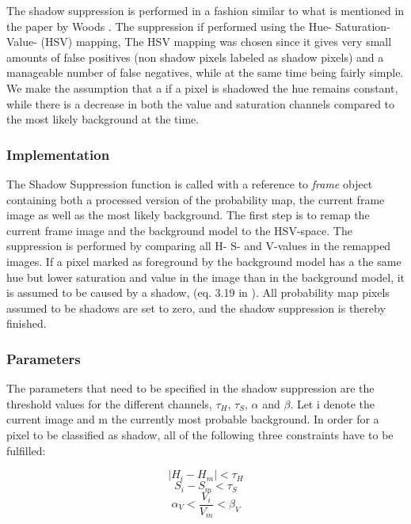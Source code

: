 The shadow suppression is performed in a fashion similar to what is mentioned in the paper by Woods \cite{Wood}. The suppression if performed using the Hue- Saturation- Value- (HSV) mapping, The HSV mapping was chosen since it gives very small amounts of false positives (non shadow pixels labeled as shadow pixels) and a manageable number of false negatives, while at the same time being fairly simple. We make the assumption that a if a pixel is shadowed the hue remains constant, while there is a decrease in both the value and saturation channels compared to the most likely background at the time.


\subsubsection{Implementation}
The Shadow Suppression function is called with a reference to \emph{frame} object containing both a processed version of the probability map, the current frame image as well as the most likely background. The first step is to remap the current frame image and the background model to the HSV-space. The suppression is performed by comparing all H- S- and V-values in the remapped images. If a pixel marked as foreground by the background model has a the same hue but lower saturation and value in the image than in the background model, it is assumed to be caused by a shadow, (eq. 3.19 in \cite{Wood}). All probability map pixels assumed to be shadows are set to zero, and the shadow suppression is thereby finished.

\subsubsection{Parameters}
The parameters that need to be specified in the shadow suppression are the threshold values for the different channels, $\tau_H$, $\tau_S$, $\alpha$ and $\beta$. Let i denote the current image and m the currently most probable background. In order for a pixel to be classified as shadow, all of the following three constraints have to be fulfilled:

\begin{equation}
	|H_i - H_m| < \tau_H
	\label{eq:H}
\end{equation}
\begin{equation}
	S_i - S_m < \tau_S
	\label{eq:S}
\end{equation}
\begin{equation}
	\alpha_V < \frac{V_i}{V_m} < \beta_V
	\label{eq:V}
\end{equation}

